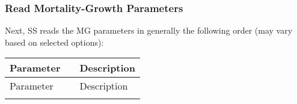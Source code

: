 \subsubsection{Read Mortality-Growth Parameters}
Next, SS reads the MG parameters in generally the following order (may vary based on selected options):

\begin{center}
	\begin{longtable}{p{1cm} p{2.5cm} p{10cm}}

		Parameter& & Description\\
		\hline
		\endfirsthead

		Parameter& & Description\\
		\hline
		\endhead

		\endfoot

		\endlastfoot


\end{longtable}
\end{center}
